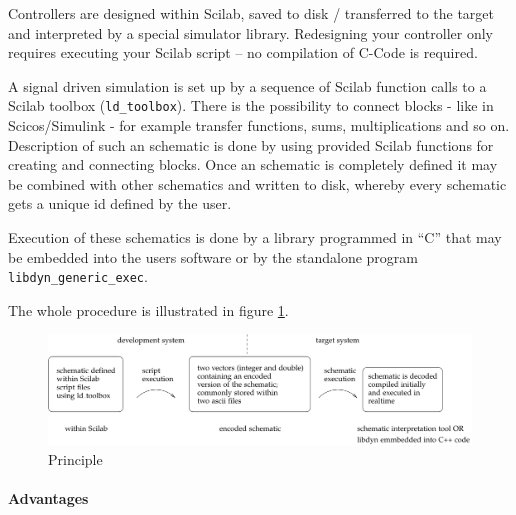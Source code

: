 \documentclass[%
	pdftex,%
	a4paper,%
	oneside,%
	11pt,%
	halfparskip,%
	headsepline,%
	bibtotocnumbered,%
	idxtotoc%
]{scrartcl}
\begin{document}
Controllers are designed within Scilab, saved to disk / transferred to the target and interpreted by a special simulator library. Redesigning your controller only requires executing your Scilab script – no compilation of C-Code is required.

A signal driven simulation is set up by a sequence of Scilab function calls to a Scilab toolbox (\texttt{ld\_toolbox}). There is the possibility to connect blocks - like in Scicos/Simulink - for example transfer functions, sums, multiplications and so on. Description of such an schematic is done by using provided Scilab functions for creating and connecting blocks. Once an schematic is completely defined it may be combined with other schematics and written to disk, whereby every schematic gets a unique id defined by the user.

Execution of these schematics is done by a library programmed in ``C'' that may be embedded into the users software or by the standalone program \texttt{libdyn\_generic\_exec}.

The whole procedure is illustrated in figure \ref{fig:principle}.

\begin{figure}[!htb]
\centering \includegraphics[width=0.98\linewidth]{pictures/principle.pdf} %
\caption{Principle}
\label{fig:principle}
\end{figure}


\paragraph{Advantages}
\end{document}
